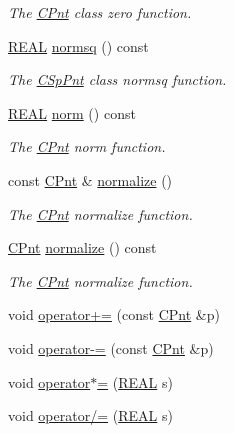 \begin{DoxyCompactItemize}
\begin{DoxyCompactList}\small\item\em The \hyperlink{classCPnt}{C\-Pnt} class zero function. \end{DoxyCompactList}\item 
\hyperlink{util_8h_a5821460e95a0800cf9f24c38915cbbde}{R\-E\-A\-L} \hyperlink{classCPnt_ac4dcf209c35c4ef0c119cd59fbddd18f}{normsq} () const 
\begin{DoxyCompactList}\small\item\em The \hyperlink{classCSpPnt}{C\-Sp\-Pnt} class normsq function. \end{DoxyCompactList}\item 
\hyperlink{util_8h_a5821460e95a0800cf9f24c38915cbbde}{R\-E\-A\-L} \hyperlink{classCPnt_ab92f2e6cc3891ff6a00eddb483b854ab}{norm} () const 
\begin{DoxyCompactList}\small\item\em The \hyperlink{classCPnt}{C\-Pnt} norm function. \end{DoxyCompactList}\item 
const \hyperlink{classCPnt}{C\-Pnt} \& \hyperlink{classCPnt_a79e4515e6479905942ce4b48990943f0}{normalize} ()
\begin{DoxyCompactList}\small\item\em The \hyperlink{classCPnt}{C\-Pnt} normalize function. \end{DoxyCompactList}\item 
\hyperlink{classCPnt}{C\-Pnt} \hyperlink{classCPnt_a59899074de56c4ad55583fc58d48ea0a}{normalize} () const 
\begin{DoxyCompactList}\small\item\em The \hyperlink{classCPnt}{C\-Pnt} normalize function. \end{DoxyCompactList}\item 
void \hyperlink{classCPnt_ab9aa57d527e60e0ba46fd44ee515ebb0}{operator+=} (const \hyperlink{classCPnt}{C\-Pnt} \&p)
\item 
void \hyperlink{classCPnt_aad46f39ec4811f1f7c39b33b0ef55f42}{operator-\/=} (const \hyperlink{classCPnt}{C\-Pnt} \&p)
\item 
void \hyperlink{classCPnt_a30b6c20eb5777d321202db9006fe5dc0}{operator$\ast$=} (\hyperlink{util_8h_a5821460e95a0800cf9f24c38915cbbde}{R\-E\-A\-L} s)
\item 
void \hyperlink{classCPnt_a5ef5437f322871129c1398ab5f5e8764}{operator/=} (\hyperlink{util_8h_a5821460e95a0800cf9f24c38915cbbde}{R\-E\-A\-L} s)
\item 

\end{DoxyCompactItemize}
